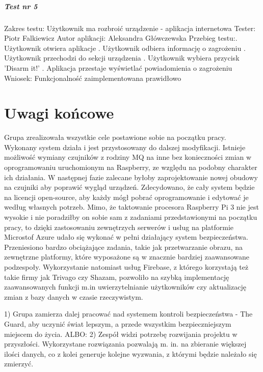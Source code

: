  \paragraph{Test nr 5}
Zakres testu:\newline
Użytkownik ma rozbroić urządzenie - aplikacja internetowa\newline
Tester: Piotr Falkiewicz \newline
Autor aplikacji: Aleksandra Główczewska \newline
Przebieg testu:. Użytkownik otwiera aplikacje . Użytkownik odbiera informację o zagrożeniu . Użytkownik przechodzi do sekcji urządzenia . Użytkownik wybiera przycisk 'Disarm it!' . Aplikacja przestaje wyświetlać powiadomienia o zagrożeniu \newline
Wniosek:\newline
Funkcjonalność zaimplementowana prawidłowo\newline
\newline

\chapter{Uwagi końcowe}

Grupa zrealizowała wszystkie cele postawione sobie na początku pracy. Wykonany system działa i jest przystosowany do dalszej modyfikacji. Istnieje możliwość wymiany czujników z rodziny MQ na inne bez konieczności zmian w oprogramowaniu uruchomionym na Raspberry, ze względu na podobny charakter ich działania. W następnej fazie zalecane byłoby zaprojektowanie nowej obudowy na czujniki aby poprawić wygląd urządzeń. Zdecydowano, że cały system będzie na licencji open-source, aby każdy mógł pobrać oprogramowanie i edytować je według własnych potrzeb. Mimo, że taktowanie procesora Raspberry Pi 3 nie jest wysokie i nie poradziłby on sobie sam z zadaniami przedstawionymi na początku pracy, to dzięki zastosowaniu zewnętrzych serwerów i usług na platformie Microstof Azure udało się wykonać w pełni działający system bezpieczeństwa. Przeniesiono bardzo obciążające zadania, takie jak przetwarzanie obrazu, na zewnętrzne platformy, które wyposażone są w znacznie bardziej zaawansowane podzespoły. Wykorzystanie natomiast usług Firebase, z którego korzystają też takie firmy jak Trivago czy Shazam, pozwoliło na szybką implementację zaawansowanych funkcji m.in uwierzytelnianie użytkowników czy aktualizację zmian z bazy danych w czasie rzeczywistym. 

1)
Grupa zamierza dalej pracować nad systemem kontroli bezpieczeństwa - The Guard, aby uczynić świat lepszym, a przede wszystkim bezpieczniejszym miejscem do życia.
ALBO:
2)
Zespół widzi potrzebę rozwijania projektu w przyszłości. Wykorzystane rozwiązania pozwalają m. in. na zbieranie większej ilości danych, co z kolei generuje kolejne wyzwania, z którymi będzie należało się zmierzyć.

